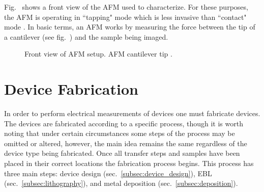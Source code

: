 \noindent Fig.~ shows a front view of the \acs{AFM} used to characterize. For these purposes, the \acs{AFM} is operating in ``tapping" mode which is less invasive than ``contact" mode \cite{Kittel_IntroSolidState2005}. In basic terms, an \acs{AFM} works by measuring the force between the tip of a cantilever (see fig.~) and the sample being imaged. 
\begin{figure}[ht]
	\centering
	\qquad
	\caption[AFM setup and AFM cantilever]{\protect{} Front view of \acs{AFM} setup. \protect{} AFM cantilever tip \cite{Ernst-Moritz-Arndt_Online}.}
\end{figure}

\section{Device Fabrication}\label{sec:device_fabrication}
In order to perform electrical measurements of devices one must fabricate devices. The devices are fabricated according to a specific process, though it is worth noting that under certain circumstances some steps of the process may be omitted or altered, however, the main idea remains the same regardless of the device type being fabricated. Once all transfer steps and samples have been placed in their correct locations the fabrication process begins. This process has three main steps: device design (sec.~\ref{subsec:device_design}), \ac{EBL} (sec.~\ref{subsec:lithography}), and metal deposition (sec.~\ref{subsec:deposition}).

